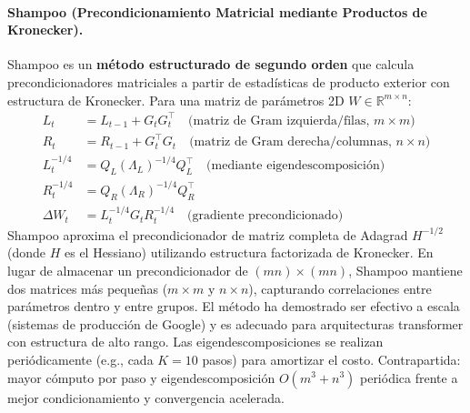 \documentclass[11pt,a4paper]{article}
\begin{document}
\paragraph{Shampoo (Precondicionamiento Matricial mediante Productos de Kronecker).}
Shampoo es un \textbf{método estructurado de segundo orden} que calcula precondicionadores matriciales a partir de estadísticas de producto exterior con estructura de Kronecker. Para una matriz de parámetros 2D $W \in \mathbb{R}^{m \times n}$:
\begin{align}
L_t &= L_{t-1} + G_t G_t^\top \quad\text{(matriz de Gram izquierda/filas, $m \times m$)} \\
R_t &= R_{t-1} + G_t^\top G_t \quad\text{(matriz de Gram derecha/columnas, $n \times n$)} \\
L_t^{-1/4} &= Q_L (\Lambda_L)^{-1/4} Q_L^\top \quad\text{(mediante eigendescomposición)} \\
R_t^{-1/4} &= Q_R (\Lambda_R)^{-1/4} Q_R^\top \\
\Delta W_t &= L_t^{-1/4} G_t R_t^{-1/4} \quad\text{(gradiente precondicionado)}
\end{align}
Shampoo aproxima el precondicionador de matriz completa de Adagrad $H^{-1/2}$ (donde $H$ es el Hessiano) utilizando estructura factorizada de Kronecker. En lugar de almacenar un precondicionador de $(mn) \times (mn)$, Shampoo mantiene dos matrices más pequeñas ($m \times m$ y $n \times n$), capturando correlaciones entre parámetros dentro y entre grupos. El método ha demostrado ser efectivo a escala (sistemas de producción de Google) y es adecuado para arquitecturas transformer con estructura de alto rango. Las eigendescomposiciones se realizan periódicamente (e.g., cada $K=10$ pasos) para amortizar el costo. Contrapartida: mayor cómputo por paso y eigendescomposición $O(m^3 + n^3)$ periódica frente a mejor condicionamiento y convergencia acelerada.
\end{document}

